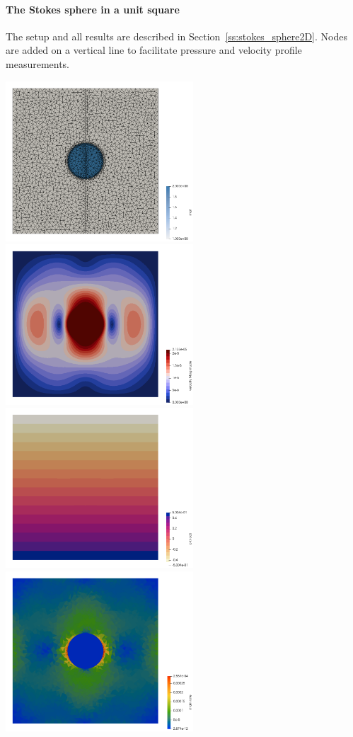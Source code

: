 \newpage
\paragraph{The Stokes sphere in a unit square}
The setup and all results are described in Section~\ref{ss:stokes_sphere2D}.
Nodes are added on a vertical line to facilitate pressure and velocity profile measurements.

\begin{center}
\includegraphics[width=7cm]{python_codes/fieldstone_93/results_exp1/grid}
\includegraphics[width=7cm]{python_codes/fieldstone_93/results_exp1/vel}\\
\includegraphics[width=7cm]{python_codes/fieldstone_93/results_exp1/press}
\includegraphics[width=7cm]{python_codes/fieldstone_93/results_exp1/sr}\\

\end{center}
